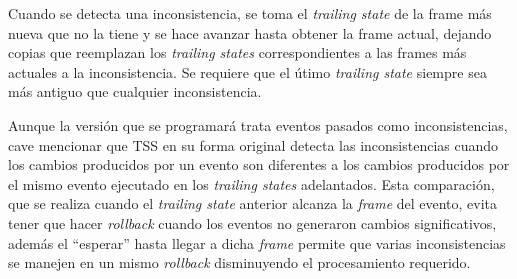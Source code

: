 Cuando se detecta una inconsistencia, se toma el \emph{trailing state} de la frame más nueva que no la tiene y se hace avanzar hasta obtener la frame actual, dejando copias que reemplazan los \emph{trailing states} correspondientes a las frames más actuales a la inconsistencia. Se requiere que el útimo \emph{trailing state} siempre sea más antiguo que cualquier inconsistencia.

Aunque la versión que se programará trata eventos pasados como inconsistencias, cave mencionar que TSS en su forma original detecta las inconsistencias cuando los cambios producidos por un evento son diferentes a los cambios producidos por el mismo evento ejecutado en los \emph{trailing states} adelantados. Esta comparación, que se realiza cuando el \emph{trailing state} anterior alcanza la \emph{frame} del evento, evita tener que hacer \emph{rollback} cuando los eventos no generaron cambios significativos, además el ``esperar'' hasta llegar a dicha \emph{frame} permite que varias inconsistencias se manejen en un mismo \emph{rollback} disminuyendo el procesamiento requerido.



